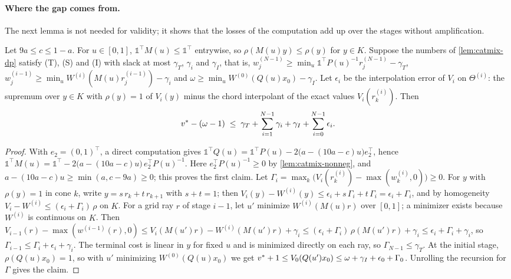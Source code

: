 \paragraph{Where the gap comes from.}
The next lemma is not needed for validity; it shows that the losses of the computation add up over the stages without amplification.

\begin{lemma}\label{lem:catmix-losses}
Let $9a \le c \le 1 - a$.
For $u \in [0,1]$, $\mathbb{1}^\top M(u) \le \mathbb{1}^\top$ entrywise, so $\rho(M(u)y) \le \rho(y)$ for $y \in K$.
Suppose the numbers of \cref{lem:catmix-dp} satisfy (T), (S) and (I) with slack at most $\gamma_T$, $\gamma_i$ and $\gamma_I$, that is, $w^{(N-1)}_j \ge \min_u \mathbb{1}^\top P(u)^{-1}r^{(N-1)}_j - \gamma_T$, $w^{(i-1)}_j \ge \min_u W^{(i)}(M(u)r^{(i-1)}_j) - \gamma_i$ and $\omega \ge \min_u W^{(0)}(Q(u)x_0) - \gamma_I$.
Let $\epsilon_i$ be the interpolation error of $V_i$ on $\Theta^{(i)}$: the supremum over $y \in K$ with $\rho(y) = 1$ of $V_i(y)$ minus the chord interpolant of the exact values $V_i(r^{(i)}_k)$.
Then
\[
v^{*} - (\omega - 1) \;\le\; \gamma_T + \sum_{i=1}^{N-1}\gamma_i + \gamma_I + \sum_{i=0}^{N-1}\epsilon_i .
\]
\end{lemma}

\begin{proof}
With $e_2 = (0,1)^\top$, a direct computation gives $\mathbb{1}^\top Q(u) = \mathbb{1}^\top P(u) - 2\bigl(a - (10a - c)u\bigr)e_2^\top$, hence $\mathbb{1}^\top M(u) = \mathbb{1}^\top - 2\bigl(a - (10a-c)u\bigr)\,e_2^\top P(u)^{-1}$.
Here $e_2^\top P(u)^{-1} \ge 0$ by \cref{lem:catmix-nonneg}, and $a - (10a - c)u \ge \min(a, c - 9a) \ge 0$; this proves the first claim.
Let $\Gamma_i = \max_k \bigl(V_i(r^{(i)}_k) - \max(w^{(i)}_k, 0)\bigr) \ge 0$.
For $y$ with $\rho(y) = 1$ in cone $k$, write $y = s\,r_k + t\,r_{k+1}$ with $s + t = 1$; then $V_i(y) - W^{(i)}(y) \le \epsilon_i + s\,\Gamma_i + t\,\Gamma_i = \epsilon_i + \Gamma_i$, and by homogeneity $V_i - W^{(i)} \le (\epsilon_i + \Gamma_i)\,\rho$ on $K$.
For a grid ray $r$ of stage $i-1$, let $u'$ minimize $W^{(i)}(M(u)r)$ over $[0,1]$; a minimizer exists because $W^{(i)}$ is continuous on $K$.
Then $V_{i-1}(r) - \max(w^{(i-1)}(r), 0) \le V_i(M(u')r) - W^{(i)}(M(u')r) + \gamma_i \le (\epsilon_i + \Gamma_i)\,\rho(M(u')r) + \gamma_i \le \epsilon_i + \Gamma_i + \gamma_i$, so $\Gamma_{i-1} \le \Gamma_i + \epsilon_i + \gamma_i$.
The terminal cost is linear in $y$ for fixed $u$ and is minimized directly on each ray, so $\Gamma_{N-1} \le \gamma_T$.
At the initial stage, $\rho(Q(u)x_0) = 1$, so with $u'$ minimizing $W^{(0)}(Q(u)x_0)$ we get $v^{*} + 1 \le V_0(Q(u')x_0) \le \omega + \gamma_I + \epsilon_0 + \Gamma_0$.
Unrolling the recursion for $\Gamma$ gives the claim.
\end{proof}


